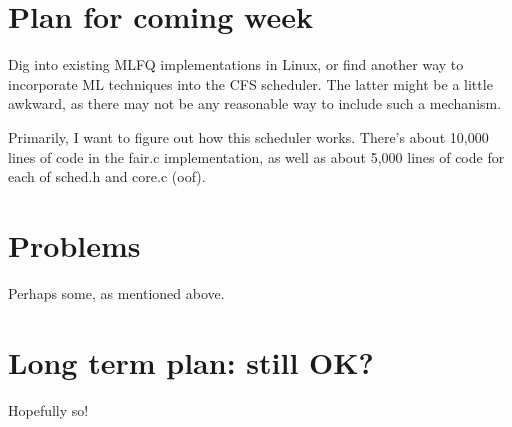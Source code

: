 \documentclass[12pt]{article}
\def\ind{\hspace*{0.3in}}
\begin{document}
\section*{Plan for coming week}
\ind Dig into existing MLFQ implementations in Linux, or find another way to incorporate ML techniques into the CFS scheduler. The latter might be a little awkward, as there may not be any reasonable way to include such a mechanism. 

Primarily, I want to figure out how this scheduler works. There's about 10,000 lines of code in the fair.c implementation, as well as about 5,000 lines of code for each of sched.h and core.c (oof).
\section*{Problems}
Perhaps some, as mentioned above.
\section*{Long term plan: still OK?}
Hopefully so! 
\end{document}

